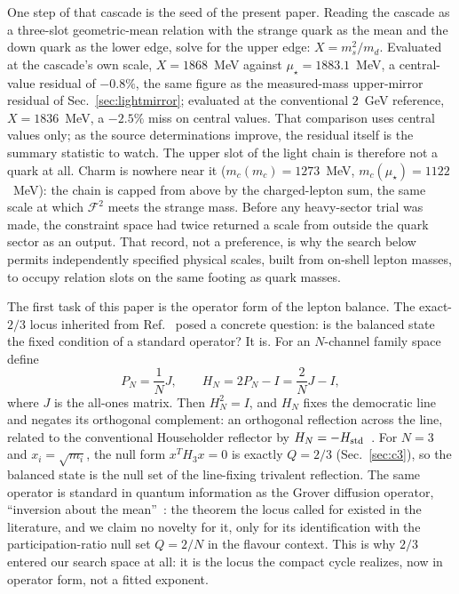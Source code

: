 \documentclass[aps,twocolumn,superscriptaddress,nofootinbib,floatfix]{revtex4-2}
\newcommand{\mstar}{\mu_\star}
\begin{document}
One step of that cascade is the seed of the present paper. Reading the cascade as a three-slot geometric-mean relation with the strange quark as the mean and the down quark as the lower edge, solve for the upper edge: $X=m_s^2/m_d$. Evaluated at the cascade's own scale, $X=1868$~MeV against $\mstar=1883.1$~MeV, a central-value residual of $-0.8\%$, the same figure as the measured-mass upper-mirror residual of Sec.~\ref{sec:lightmirror}; evaluated at the conventional $2$~GeV reference, $X=1836$~MeV, a $-2.5\%$ miss on central values. That comparison uses central values only; as the source determinations improve, the residual itself is the summary statistic to watch. The upper slot of the light chain is therefore not a quark at all. Charm is nowhere near it ($m_c(m_c)=1273$~MeV, $m_c(\mstar)=1122$~MeV): the chain is capped from above by the charged-lepton sum, the same scale at which $\mathcal F^2$ meets the strange mass. Before any heavy-sector trial was made, the constraint space had twice returned a scale from outside the quark sector as an output. That record, not a preference, is why the search below permits independently specified physical scales, built from on-shell lepton masses, to occupy relation slots on the same footing as quark masses.

The first task of this paper is the operator form of the lepton balance. The exact-$2/3$ locus inherited from Ref.~\cite{BrilliantMPLA} posed a concrete question: is the balanced state the fixed condition of a standard operator? It is. For an $N$-channel family space define
\begin{equation}
P_N=\frac{1}{N}J,
\qquad
H_N=2P_N-I=\frac{2}{N}J-I,
\label{eq:SN}
\end{equation}
where $J$ is the all-ones matrix. Then $H_N^2=I$, and $H_N$ fixes the democratic line and negates its orthogonal complement: an orthogonal reflection across the line, related to the conventional Householder reflector by $H_N=-H_{\rm std}$~\cite{GolubVanLoan,TrefethenBau}. For $N=3$ and $x_i=\sqrt{m_i}$, the null form $x^TH_3x=0$ is exactly $Q=2/3$ (Sec.~\ref{sec:c3}), so the balanced state is the null set of the line-fixing trivalent reflection. The same operator is standard in quantum information as the Grover diffusion operator, ``inversion about the mean''~\cite{Grover1997}: the theorem the locus called for existed in the literature, and we claim no novelty for it, only for its identification with the participation-ratio null set $Q=2/N$ in the flavour context. This is why $2/3$ entered our search space at all: it is the locus the compact cycle realizes, now in operator form, not a fitted exponent.
\end{document}

